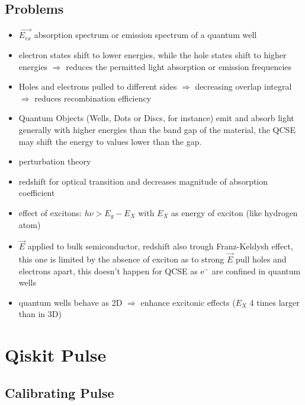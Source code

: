 \subsection{Problems}
\begin{itemize}
    \item $\vec{E_{ex}}$ absorption spectrum or emission spectrum of a quantum well
    \item electron states shift to lower energies, while the hole states shift to higher energies
        $\Rightarrow$ reduces the permitted light absorption or emission frequencies
    \item Holes and electrons pulled to different sides $\Rightarrow$ decreasing overlap integral $\Rightarrow$ reduces recombination efficiency
    \item Quantum Objects (Wells, Dots or Discs, for instance) emit and absorb light generally with higher energies than the band gap of the material, the QCSE may shift the energy to values lower than the gap.
    \item perturbation theory
    \item redshift for optical transition and decreases magnitude of absorption coefficient
    \item effect of excitons: $ h \nu > E_g - E_X $ with $E_X$ as energy of exciton (like hydrogen atom)
    \item $\vec{E}$ applied to bulk semiconductor, redshift also trough Franz-Keldysh effect, this one is limited by the absence of exciton as to strong $\vec{E}$ pull holes and electrons apart, this doesn't happen for QCSE as $\mathrm{e^-}$ are confined in quantum wells
    \item quantum wells behave as 2D $\Rightarrow$ enhance excitonic effects ($E_X$ 4 times larger than in 3D)

\end{itemize}

\section{Qiskit Pulse}

\subsection{Calibrating Pulse}

